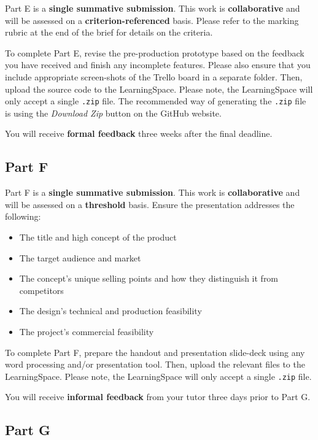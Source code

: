 \documentclass{../fal_assignment}
\begin{document}
Part E is a \textbf{single summative submission}. This work is \textbf{collaborative} and will be assessed on a \textbf{criterion-referenced} basis. Please refer to the marking rubric at the end of the brief for details on the criteria.

To complete Part E, revise the pre-production prototype based on the feedback you have received and finish any incomplete features. Please also ensure that you include appropriate screen-shots of the Trello board in a separate folder. Then, upload the source code to the LearningSpace. Please note, the LearningSpace will only accept a single \texttt{.zip} file. The recommended way of generating the \texttt{.zip} file is using the \textit{Download Zip} button on the GitHub website.

You will receive \textbf{formal feedback} three weeks after the final deadline.

\subsection*{Part F}

Part F is a \textbf{single summative submission}. This work is \textbf{collaborative} and will be assessed on a \textbf{threshold} basis. Ensure the presentation addresses the following:

\begin{itemize}
	\item The title and high concept of the product
	\item The target audience and market
	\item The concept's unique selling points and how they distinguish it from competitors
	\item The design's technical and production feasibility
	\item The project's commercial feasibility
\end{itemize}

To complete Part F, prepare the handout and presentation slide-deck using any word processing and/or presentation tool. Then, upload the relevant files to the LearningSpace. Please note, the LearningSpace will only accept a single \texttt{.zip} file.

You will receive \textbf{informal feedback} from your tutor three days prior to Part G.

\subsection*{Part G}
\end{document}
